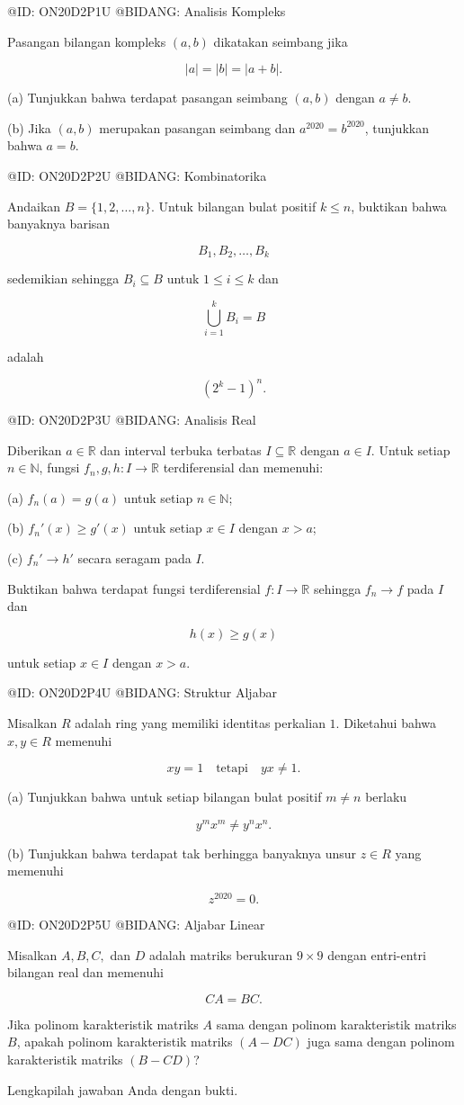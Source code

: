 @ID: ON20D2P1U
@BIDANG: Analisis Kompleks

Pasangan bilangan kompleks $(a,b)$ dikatakan seimbang jika

$$
|a|=|b|=|a+b|.
$$

(a) Tunjukkan bahwa terdapat pasangan seimbang $(a,b)$ dengan $a\ne b$.

(b) Jika $(a,b)$ merupakan pasangan seimbang dan $a^{2020}=b^{2020}$, tunjukkan bahwa $a=b$.

@ID: ON20D2P2U
@BIDANG: Kombinatorika

Andaikan $B=\{1,2,\dots,n\}$. Untuk bilangan bulat positif $k\le n$, buktikan bahwa banyaknya barisan

$$
B_1,B_2,\dots,B_k
$$

sedemikian sehingga $B_i\subseteq B$ untuk $1\le i\le k$ dan

$$
\bigcup_{i=1}^k B_i=B
$$

adalah

$$
(2^k-1)^n.
$$

@ID: ON20D2P3U
@BIDANG: Analisis Real

Diberikan $a\in\mathbb R$ dan interval terbuka terbatas $I\subseteq\mathbb R$ dengan $a\in I$. Untuk setiap $n\in\mathbb N$, fungsi $f_n,g,h:I\rightarrow\mathbb R$ terdiferensial dan memenuhi:

(a) $f_n(a)=g(a)$ untuk setiap $n\in\mathbb N$;

(b) $f_n'(x)\ge g'(x)$ untuk setiap $x\in I$ dengan $x>a$;

(c) $f_n'\to h'$ secara seragam pada $I$.

Buktikan bahwa terdapat fungsi terdiferensial $f:I\rightarrow\mathbb R$ sehingga $f_n\to f$ pada $I$ dan

$$
h(x)\ge g(x)
$$

untuk setiap $x\in I$ dengan $x>a$.

@ID: ON20D2P4U
@BIDANG: Struktur Aljabar

Misalkan $R$ adalah ring yang memiliki identitas perkalian $1$. Diketahui bahwa $x,y\in R$ memenuhi

$$
xy=1
\quad\text{tetapi}\quad
yx\ne1.
$$

(a) Tunjukkan bahwa untuk setiap bilangan bulat positif $m\ne n$ berlaku

$$
y^mx^m\ne y^nx^n.
$$

(b) Tunjukkan bahwa terdapat tak berhingga banyaknya unsur $z\in R$ yang memenuhi

$$
z^{2020}=0.
$$

@ID: ON20D2P5U
@BIDANG: Aljabar Linear

Misalkan $A,B,C,$ dan $D$ adalah matriks berukuran $9\times9$ dengan entri-entri bilangan real dan memenuhi

$$
CA=BC.
$$

Jika polinom karakteristik matriks $A$ sama dengan polinom karakteristik matriks $B$, apakah polinom karakteristik matriks $(A-DC)$ juga sama dengan polinom karakteristik matriks $(B-CD)$?

Lengkapilah jawaban Anda dengan bukti.
